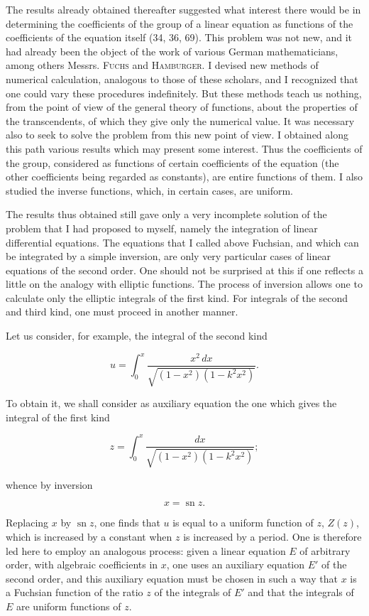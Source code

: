 \documentclass[11pt]{article}
\begin{document}
The results already obtained thereafter suggested what interest there would be in determining the coefficients of the group of a linear equation as functions of the coefficients of the equation itself (34, 36, 69). This problem was not new, and it had already been the object of the work of various German mathematicians, among others Messrs. \textsc{Fuchs} and \textsc{Hamburger}. I devised new methods of numerical calculation, analogous to those of these scholars, and I recognized that one could vary these procedures indefinitely. But these methods teach us nothing, from the point of view of the general theory of functions, about the properties of the transcendents, of which they give only the numerical value. It was necessary also to seek to solve the problem from this new point of view. I obtained along this path various results which may present some interest. Thus the coefficients of the group, considered as functions of certain coefficients of the equation (the other coefficients being regarded as constants), are entire functions of them. I also studied the inverse functions, which, in certain cases, are uniform.

The results thus obtained still gave only a very incomplete solution of the problem that I had proposed to myself, namely the integration of linear differential equations. The equations that I called above Fuchsian, and which can be integrated by a simple inversion, are only very particular cases of linear equations of the second order. One should not be surprised at this if one reflects a little on the analogy with elliptic functions. The process of inversion allows one to calculate only the elliptic integrals of the first kind. For integrals of the second and third kind, one must proceed in another manner.

Let us consider, for example, the integral of the second kind

\[
 u=\int_0^x \frac{x^2\,dx}{\sqrt{(1-x^2)(1-k^2x^2)}}.
\]

To obtain it, we shall consider as auxiliary equation the one which gives the integral of the first kind

\[
 z=\int_0^x \frac{dx}{\sqrt{(1-x^2)(1-k^2x^2)}};
\]

whence by inversion

\[
 x=\operatorname{sn} z.
\]

Replacing $x$ by $\operatorname{sn} z$, one finds that $u$ is equal to a uniform function of $z$, $Z(z)$, which is increased by a constant when $z$ is increased by a period. One is therefore led here to employ an analogous process: given a linear equation $E$ of arbitrary order, with algebraic coefficients in $x$, one uses an auxiliary equation $E'$ of the second order, and this auxiliary equation must be chosen in such a way that $x$ is a Fuchsian function of the ratio $z$ of the integrals of $E'$ and that the integrals of $E$ are uniform functions of $z$.
\end{document}
